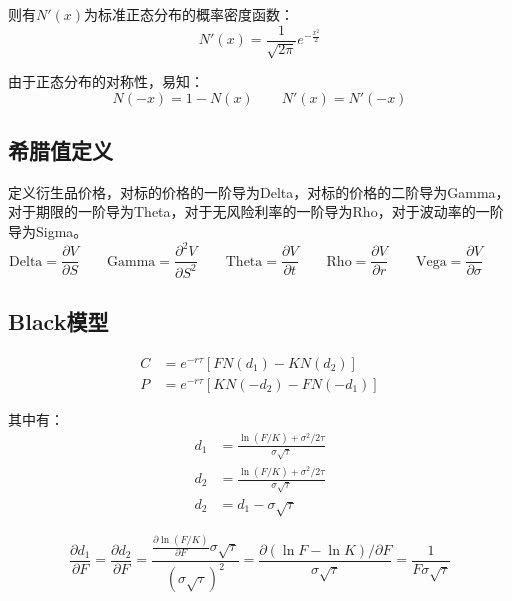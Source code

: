 \documentclass[11pt]{article}
\begin{document}
则有$N'(x)$为标准正态分布的概率密度函数：
\begin{equation*}
    N'(x) = \frac{1}{\sqrt{2\pi}} e^{-\frac{x^2}{2}}
\end{equation*}

由于正态分布的对称性，易知：
\begin{equation*}
    N(-x) = 1-N(x) \qquad
    N'(x) = N'(-x)
\end{equation*}

\subsection{希腊值定义}

定义衍生品价格，对标的价格的一阶导为Delta，对标的价格的二阶导为Gamma，对于期限的一阶导为Theta，对于无风险利率的一阶导为Rho，对于波动率的一阶导为Sigma。
\begin{equation*}
    \text{Delta} = \frac{\partial V}{\partial S} \qquad 
    \text{Gamma}  = \frac{\partial^2 V}{\partial S^2} \qquad
    \text{Theta} = \frac{\partial V}{\partial t} \qquad
    \text{Rho} = \frac{\partial V}{\partial r} \qquad
    \text{Vega} = \frac{\partial V}{\partial\sigma} \qquad
\end{equation*}

\subsection{Black模型}

\begin{align*}
    C &= e^{-r\tau}[FN(d_1) - KN(d_2)] \\
    P &= e^{-r\tau}[KN(-d_2) - FN(-d_1)]
\end{align*}

其中有：
\begin{align*}
    d_1 &= \frac{\ln(F/K) + \sigma^2/2\tau}{\sigma \sqrt{\tau}} \\
    d_2 &= \frac{\ln(F/K) + \sigma^2/2\tau}{\sigma \sqrt{\tau}} \\
    d_2 &= d_1 - \sigma \sqrt{\tau}
\end{align*}

\begin{equation*}
    \frac{\partial d_1}{\partial F} = \frac{\partial d_2}{\partial F} = \frac{\frac{\partial \ln(F/K)}{\partial F} \sigma \sqrt{\tau}}{(\sigma \sqrt{\tau})^2} = \frac{\partial (\ln F - \ln K)/\partial F}{\sigma\sqrt{\tau}} = \frac{1}{F\sigma\sqrt{\tau}}
\end{equation*}
\end{document}
